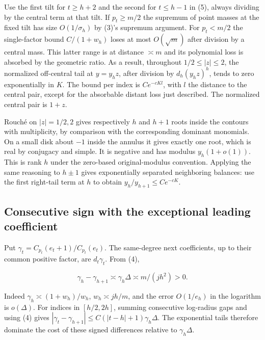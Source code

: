 \documentclass[11pt]{article}
\begin{document}
Use the first tilt for \(t\ge h+2\) and the second for \(t\le h-1\) in (5), always dividing by the central term at that tilt. If \(p_t\ge m/2\) the supremum of point masses at the fixed tilt has size \(O(1/\sigma_h)\) by (3)'s supremum argument. For \(p_t<m/2\) the single-factor bound \(C/(1+w_h)\) loses at most \(O(\sqrt m)\) after division by a central mass. This latter range is at distance \(\asymp m\) and its polynomial loss is absorbed by the geometric ratio. As a result, throughout \(1/2\le |z|\le2\), the normalized off-central tail at \(y=y_h z\), after division by \(d_h(y_hz)^h\), tends to zero exponentially in \(K\). The bound per index is \(Ce^{-cK l}\), with \(l\) the distance to the central pair, except for the absorbable distant loss just described. The normalized central pair is \(1+z\).

Rouché on \(|z|=1/2,2\) gives respectively \(h\) and \(h+1\) roots inside the contours with multiplicity, by comparison with the corresponding dominant monomials. On a small disk about \(-1\) inside the annulus it gives exactly one root, which is real by conjugacy and simple. It is negative and has modulus \(y_h(1+o(1))\). This is rank \(h\) under the zero-based original-modulus convention. Applying the same reasoning to \(h\pm1\) gives exponentially separated neighboring balances: use the first right-tail term at \(h\) to obtain \(y_h/y_{h+1}\le Ce^{-cK}\).

\subsection{Consecutive sign with the exceptional leading coefficient}
\label{sec:consecutive-sign-with-the-exceptional-leading-coefficient}

Put \(\gamma_t=C_{p_t}(e_t+1)/C_{p_t}(e_t)\). The same-degree next coefficients, up to their common positive factor, are \(d_t\gamma_t\). From (4),

\begin{equation*}
\gamma_h-\gamma_{h+1}\asymp \gamma_h\Delta\asymp m/(jh^2)>0.
\end{equation*}

Indeed \(\gamma_h\asymp(1+w_h)/w_h\), \(w_h\asymp jh/m\), and the error \(O(1/e_h)\) in the logarithm is \(o(\Delta)\). For indices in \([h/2,2h]\), summing consecutive log-radius gaps and using (4) gives \(|\gamma_t-\gamma_{h+1}|\le C(|t-h|+1)\gamma_h\Delta\). The exponential tails therefore dominate the cost of these signed differences relative to \(\gamma_h\Delta\).
\end{document}
